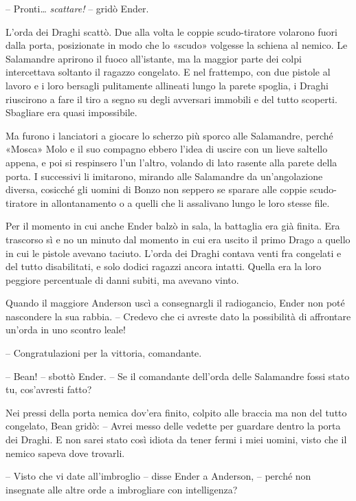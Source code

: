 {-- Pronti\ldots{} \emph{scattare!} -- gridò Ender.}

{L'orda dei Draghi scattò. Due alla volta le coppie scudo-tiratore
	volarono fuori dalla porta, posizionate in modo che lo «scudo» volgesse
	la schiena al nemico. Le Salamandre aprirono il fuoco all'istante, ma la
	maggior parte dei colpi intercettava soltanto il ragazzo congelato. E
	nel frattempo, con due pistole al lavoro e i loro bersagli pulitamente
	allineati lungo la parete spoglia, i Draghi riuscirono a fare il tiro a
	segno su degli avversari immobili e del tutto scoperti. Sbagliare era
	quasi impossibile.}

{Ma furono i lanciatori a giocare lo scherzo più sporco alle Salamandre,
	perché «Mosca» Molo e il suo compagno ebbero l'idea di uscire con un
	lieve saltello appena, e poi si respinsero l'un l'altro, volando di lato
	rasente alla parete della porta. I successivi li imitarono, mirando alle
	Salamandre da un'angolazione diversa, cosicché gli uomini di Bonzo non
	seppero se sparare alle coppie scudo-tiratore in allontanamento o a
	quelli che li assalivano lungo le loro stesse file.}

{Per il momento in cui anche Ender balzò in sala, la battaglia era già
	finita. Era trascorso sì e no un minuto dal momento in cui era uscito il
	primo Drago a quello in cui le pistole avevano taciuto. L'orda dei
	Draghi contava venti fra congelati e del tutto disabilitati, e solo
	dodici ragazzi ancora intatti. Quella era la loro peggiore percentuale
	di danni subiti, ma avevano vinto.}

{Quando il maggiore Anderson uscì a consegnargli il radiogancio, Ender
	non poté nascondere la sua rabbia. -- Credevo che ci avreste dato la
	possibilità di affrontare un'orda in uno scontro leale!}

{-- Congratulazioni per la vittoria, comandante.}

{-- Bean! -- sbottò Ender. -- Se il comandante dell'orda delle
	Salamandre fossi stato tu, cos'avresti fatto?}

{Nei pressi della porta nemica dov'era finito, colpito alle braccia ma
	non del tutto congelato, Bean gridò: -- Avrei messo delle vedette per
	guardare dentro la porta dei Draghi. E non sarei stato così idiota da
	tener fermi i miei uomini, visto che il nemico sapeva dove trovarli.}

{-- Visto che vi date all'imbroglio -- disse Ender a Anderson, -- perché
	non insegnate alle altre orde a imbrogliare con intelligenza?}

